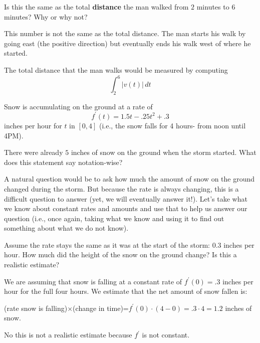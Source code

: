 \documentclass[nooutcomes]{ximera}
\renewenvironment{freeResponse}{
\ifhandout\setbox0\vbox\bgroup\else
\begin{trivlist}\item[\hskip \labelsep\bfseries Solution:\hspace{2ex}]
\fi}
{\ifhandout\egroup\else
\end{trivlist}
\fi}
\renewcommand{\d}{\,d}
\newcommand{\dfn}{\textbf}
\begin{document}
\begin{problem}
\begin{enumerate}
  \item  Is this the same as the total \dfn{distance} the man walked from $2$ minutes to $6$ minutes?
    Why or why not?
    \begin{freeResponse}
      This number is not the same as the total distance.
      The man starts his walk by going east (the positive direction) but eventually ends his walk west of where he started.
      
      The total distance that the man walks would be measured by computing 
      $$\int_2^6 \left| v(t) \right| \d t$$  
    \end{freeResponse}
  \end{enumerate}
\end{problem}

\begin{problem}
  Snow is accumulating on the ground at a rate of  
  $$f^\prime (t)=1.5t-.25 t^2+.3$$
  inches per hour for $t$ in $[0,4]$ (i.e., the snow falls for 4 hours- from noon until 4PM).  

  There were already $5$ inches of snow on the ground when the storm started.  What does this statement say notation-wise?

  A natural question would be to ask how much the amount of snow on the ground changed during the storm.  But because the rate is always changing, this is a difficult question to answer (yet, we will eventually answer it!).  Let’s take what we know about constant rates and amounts and use that to help us answer our question (i.e., once again, taking what we know and using it to find out something about what we do not know).

  \begin{enumerate}
    

  \item  Assume the rate stays the same as it was at the start of the storm: 0.3 inches per hour.  How much did the height of the snow on the ground change?  Is this a realistic estimate?
    \begin{freeResponse}
      We are assuming that snow is falling at a constant rate of $f^\prime (0)=.3$ inches per hour for the full four hours.  We estimate that the net amount of snow fallen is:
      
      (rate snow is falling)$\times$(change in time)=$f^\prime (0) \cdot (4-0) =.3 \cdot 4=1.2$ inches of snow.  
      
      No this is not a realistic estimate because $f^\prime$ is not constant.
    \end{freeResponse}


\end{enumerate}
\end{problem}
\end{document}
